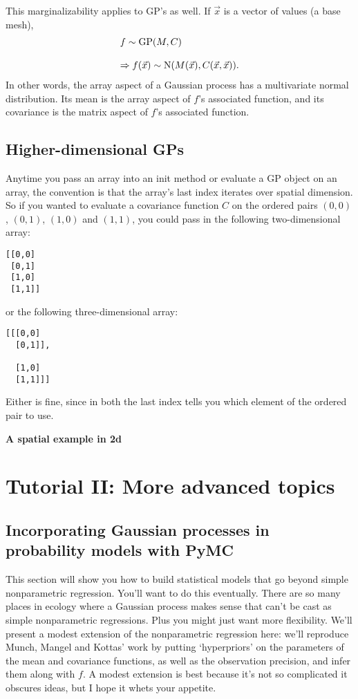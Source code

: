 \documentclass{manual}
\begin{document}
This marginalizability applies to GP's as well. If $\vec x$ is a vector of values (a base mesh),
\begin{equation}
	\begin{array}{l}
		f\sim\textup{GP}(M, C)\\\\
		\Rightarrow f(\vec x) \sim\textup N(M(\vec x), C(\vec x,\vec x)).
	\end{array}
\end{equation}
In other words, the array aspect of a Gaussian process  has a multivariate normal distribution. Its mean is the array aspect of $f$'s associated  function, and its covariance is the matrix aspect of $f$'s associated  function. 

\section{Higher-dimensional GPs}\label{sec:highdim} %
Anytime you pass an array into an init method or evaluate a GP object on an array, the convention is that the array's last index iterates over spatial dimension. So if you wanted to evaluate a covariance function $C$ on the ordered pairs $(0,0)$, $(0,1)$, $(1,0)$ and $(1,1)$, you could pass in the following two-dimensional array:
\begin{verbatim}
[[0,0]
 [0,1]
 [1,0]
 [1,1]]
\end{verbatim}
or the following three-dimensional array:
\begin{verbatim}
[[[0,0]
  [0,1]],

  [1,0]
  [1,1]]]
\end{verbatim}
Either is fine, since in both the last index tells you which element of the ordered pair to use.

\textbf{A spatial example in 2d}

\chapter{Tutorial II: More advanced topics}\label{cha:adv} %

\section{Incorporating Gaussian processes in probability models with PyMC}\label{sec:PyMC} %
This section will show you how to build statistical models that go beyond simple nonparametric regression. You'll want to do this eventually. There are so many places in ecology where a Gaussian process makes sense that can't be cast as simple nonparametric regressions. Plus you might just want more flexibility. We'll present a modest extension of the nonparametric regression here: we'll reproduce Munch, Mangel and Kottas' work by putting `hyperpriors' on the parameters of the mean and covariance functions, as well as the observation precision, and infer them along with $f$. A modest extension is best because it's not so complicated it obscures ideas, but I hope it whets your appetite.
\end{document}

